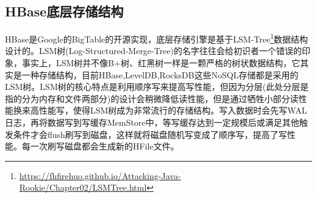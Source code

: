 \documentclass[../../../interview-questions.tex]{subfiles}
\begin{document}
\subsection{HBase底层存储结构}

HBase是Google的BigTable的开源实现，底层存储引擎是基于LSM-Tree\footnote{\url{https://fhfirehuo.github.io/Attacking-Java-Rookie/Chapter02/LSMTree.html}}数据结构设计的。LSM树(Log-Structured-Merge-Tree)的名字往往会给初识者一个错误的印象，事实上，LSM树并不像B+树、红黑树一样是一颗严格的树状数据结构，它其实是一种存储结构，目前HBase,LevelDB,RocksDB这些NoSQL存储都是采用的LSM树。LSM树的核心特点是利用顺序写来提高写性能，但因为分层(此处分层是指的分为内存和文件两部分)的设计会稍微降低读性能，但是通过牺牲小部分读性能换来高性能写，使得LSM树成为非常流行的存储结构。写入数据时会先写WAL日志，再将数据写到写缓存MemStore中，等写缓存达到一定规模后或满足其他触发条件才会flush刷写到磁盘，这样就将磁盘随机写变成了顺序写，提高了写性能。每一次刷写磁盘都会生成新的HFile文件。
\end{document}
